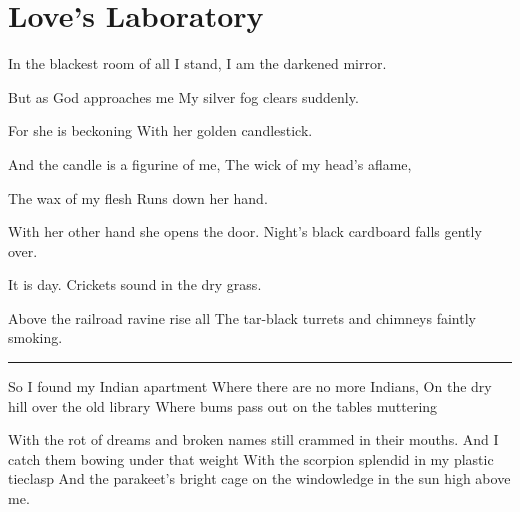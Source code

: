 \documentclass[english,11pt,letterpaper,onecolumn,parskip=full]{scrbook}
\begin{document}
\newpage
\section{Love's Laboratory}

\begin{poem}
\begin{stanza}
In the blackest room of all I stand,\verseline
I am the darkened mirror.
\end{stanza}

\begin{stanza}
But as God approaches me\verseline
My silver fog clears suddenly.
\end{stanza}

\begin{stanza}
For she is beckoning\verseline
With her golden candlestick.
\end{stanza}

\begin{stanza}
And the candle is a figurine of me,\verseline
The wick of my head's aflame,
\end{stanza}

\begin{stanza}
The wax of my flesh \verseline
Runs down her hand.
\end{stanza}

\begin{stanza}
With her other hand she opens the door.\verseline
Night's black cardboard falls gently over.
\end{stanza}

\begin{stanza}
It is day.\verseline
Crickets sound in the dry grass.
\end{stanza}

\begin{stanza}
Above the railroad ravine rise all\verseline
The tar-black turrets and chimneys faintly smoking.
\end{stanza}

\begin{center}\rule[3pt]{2in}{0.5pt}\end{center}

\begin{stanza}
So I found my Indian apartment\verseline
Where there are no more Indians,\verseline
On the dry hill over the old library\verseline
Where bums pass out on the tables muttering
\end{stanza}

\begin{stanza}
With the rot of dreams and broken names still crammed in their mouths.\verseline
And I catch them bowing under that weight\verseline
With the scorpion splendid in my plastic tieclasp\verseline
And the parakeet's bright cage on the windowledge in the sun high above me.
\end{stanza}


\end{poem}
\end{document}
